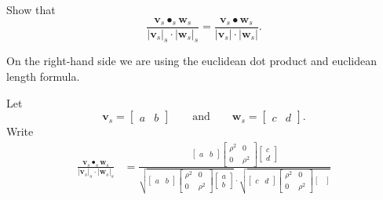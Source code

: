 \documentclass[newpage,hints,12pt,noauthor,nooutcomes]{ximera}
\begin{document}
\begin{problem}
  Show that
  \[
  \frac{\mathbf{v}_s\bullet_s \mathbf{w}_s}{|\mathbf{v}_s|_s\cdot|\mathbf{w}_s|_s} = \frac{\mathbf{v}_s\bullet \mathbf{w}_s}{|\mathbf{v}_s|\cdot|\mathbf{w}_s|}.
  \]
  \begin{hint}
    On the right-hand side we are using the euclidean dot product and
    euclidean length formula.
  \end{hint}
    \begin{freeResponse}
    Let
      \[
      \mathbf{v}_s=
      \begin{bmatrix}
        a & b
      \end{bmatrix}
      \qquad\text{and}\qquad
      \mathbf{w}_s=
      \begin{bmatrix}
        c & d
      \end{bmatrix}.
      \]
      Write
      \begin{align*}
        \frac{\mathbf{v}_s\bullet_s \mathbf{w}_s}{|\mathbf{v}_s|_s\cdot|\mathbf{w}_s|_s} &= \frac{
          \begin{bmatrix}
            a & b
          \end{bmatrix}
          \begin{bmatrix}
            \rho^2 & 0 \\
            0 & \rho^2
          \end{bmatrix}
          \begin{bmatrix}
            c\\
            d
          \end{bmatrix}
        }{
          \sqrt{\begin{bmatrix}
            a & b
          \end{bmatrix}
          \begin{bmatrix}
            \rho^2 & 0 \\
            0 & \rho^2
          \end{bmatrix}
          \begin{bmatrix}
            a\\
            b
          \end{bmatrix}}
          \cdot
          \sqrt{\begin{bmatrix}
            c & d
          \end{bmatrix}
          \begin{bmatrix}
            \rho^2 & 0 \\
            0 & \rho^2
          \end{bmatrix}
          \begin{bmatrix}

\end{bmatrix}}}
\end{align*}
\end{freeResponse}
\end{problem}
\end{document}
